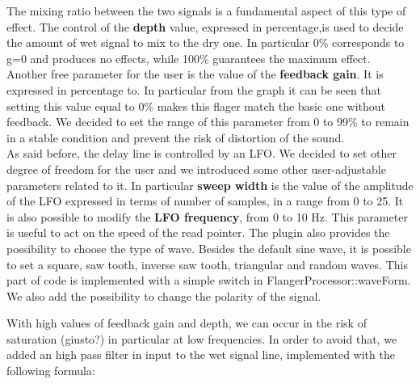 The mixing ratio between the two signals is a fundamental aspect of this type of effect. The control of the \textbf{depth} value, expressed in percentage,is used to decide the amount of wet signal to mix to the dry one. In particular 0\% corresponds to g=0 and produces no effects, while 100\% guarantees the maximum effect.\\
Another free parameter for the user is the value of the \textbf{feedback gain}. It is expressed in percentage to. In particular from the graph it can be seen that setting this value equal to 0\% makes this flager match the basic one without feedback. We decided to set the range of this parameter from 0 to 99\% to remain in a stable condition and prevent the risk of distortion of the sound.\\
As said before, the delay line is controlled by an LFO. We decided to set other degree of freedom for the user and we introduced some other user-adjustable parameters related to it. In particular \textbf{sweep width} is the value of the amplitude of the LFO expressed in terms of number of samples, in a range from  0 to 25. It is also possible to modify the \textbf{LFO frequency}, from 0 to 10 Hz. This parameter is useful to act on the speed of the read pointer. The plugin also provides the possibility to choose the type of wave. Besides the default sine wave, it is possible to set a square, saw tooth, inverse saw tooth, triangular and random waves. This part of code is implemented with a simple switch in FlangerProcessor::waveForm.
We also add the possibility to change the polarity of the signal.

With high values of feedback gain and depth, we can occur in the risk of saturation (giusto?) in particular at low frequencies. In order to avoid that, we added an high pass filter in input to the wet signal line, implemented with the following formula:




